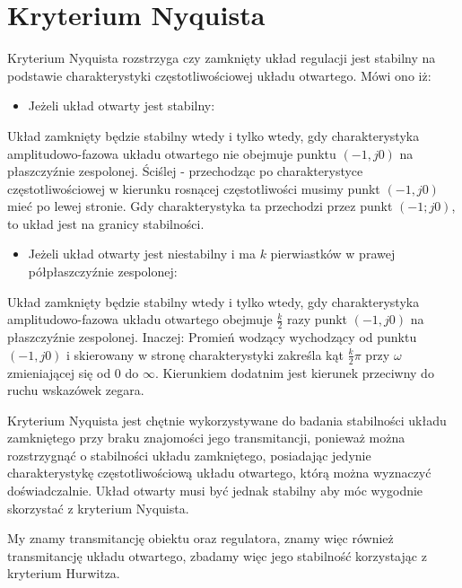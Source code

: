 \documentclass[12pt]{article}
\begin{document}
\newpage

\section{Kryterium Nyquista}

Kryterium Nyquista rozstrzyga czy zamknięty układ regulacji jest stabilny na
podstawie charakterystyki częstotliwościowej układu otwartego. Mówi ono iż:

\begin{itemize}
  \item Jeżeli układ otwarty jest stabilny:
\end{itemize}

Układ zamknięty będzie stabilny wtedy i tylko wtedy, gdy charakterystyka
amplitudowo-fazowa układu otwartego nie obejmuje punktu $(-1,j0)$ na
płaszczyźnie zespolonej. Ściślej - przechodząc po charakterystyce
częstotliwościowej w kierunku rosnącej częstotliwości musimy punkt
$(-1,j0)$ mieć po lewej stronie. Gdy charakterystyka ta przechodzi przez punkt
$(-1;j0)$, to układ jest na granicy stabilności.

\begin{itemize}
  \item Jeżeli układ otwarty jest niestabilny i ma $k$ pierwiastków w prawej
półpłaszczyźnie zespolonej:
\end{itemize}

Układ zamknięty będzie stabilny wtedy i tylko wtedy, gdy charakterystyka
amplitudowo-fazowa układu otwartego obejmuje $\frac{k}{2}$ razy punkt $(-1, j0)$
na płaszczyźnie zespolonej. Inaczej: Promień wodzący wychodzący od punktu
$(-1,j0)$ i skierowany w stronę charakterystyki zakreśla kąt $\frac{k}{2}\pi$
przy $\omega$ zmieniającej się od $0$ do $\infty$. Kierunkiem dodatnim jest kierunek
przeciwny do ruchu wskazówek zegara.

\vspace{1cm}

Kryterium Nyquista jest chętnie wykorzystywane do badania stabilności układu
zamkniętego przy braku znajomości jego transmitancji, ponieważ można
rozstrzygnąć o stabilności układu zamkniętego, posiadając jedynie
charakterystykę częstotliwościową układu otwartego, którą można wyznaczyć
doświadczalnie. Układ otwarty musi być jednak stabilny aby móc wygodnie
skorzystać z kryterium Nyquista.

My znamy transmitancję obiektu oraz regulatora, znamy więc również transmitancję
układu otwartego, zbadamy więc jego stabilność korzystając z kryterium Hurwitza.
\end{document}
